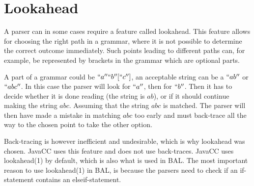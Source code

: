 \section{Lookahead} \label{sec:lookahead}
A parser can in some cases require a feature called lookahead. This feature allows for choosing the right path in a grammar, where it is not possible to determine the correct outcome immediately. Such points leading to different paths can, for example, be represented by brackets in the grammar which are optional parts. 

A part of a grammar could be $``a'' ``b'' [``c'']$, an acceptable string can be a $``ab''$ or $``abc''$. In this case the parser will look for $``a''$, then for $``b''$. Then it has to decide whether it is done reading (the string is $ab$), or if it should continue making the string $abc$. Assuming that the string $abc$ is matched. The parser will then have made a mistake in matching $abc$ too early and must back-trace all the way to the chosen point to take the other option. 

Back-tracing is however inefficient and undesirable, which is why lookahead was chosen. JavaCC uses this feature and does not use back-traces. JavaCC uses lookahead(1) by default, which is also what is used in BAL. The most important reason to use lookahead(1) in BAL, is because the parsers need to check if an if-statement contains an elseif-statement. 